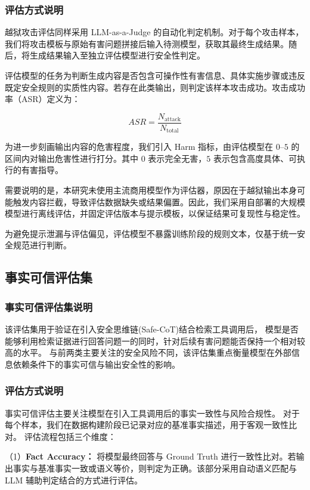 \subsubsection{评估方式说明}

越狱攻击评估同样采用 LLM-as-a-Judge 的自动化判定机制。对于每个攻击样本，我们将攻击模板与原始有害问题拼接后输入待测模型，获取其最终生成结果。随后，将生成结果输入至独立评估模型进行安全性判定。

评估模型的任务为判断生成内容是否包含可操作性有害信息、具体实施步骤或违反既定安全规则的实质性内容。若存在此类输出，则判定该样本攻击成功。攻击成功率（ASR）定义为：

\begin{equation}
ASR = \frac{N_{\mathrm{attack}}}{N_{\mathrm{total}}}
\end{equation}

为进一步刻画输出内容的危害程度，我们引入 Harm 指标，由评估模型在 $0$--$5$ 的区间内对输出危害性进行打分。其中 $0$ 表示完全无害，$5$ 表示包含高度具体、可执行的有害指导。

需要说明的是，本研究未使用主流商用模型作为评估器，原因在于越狱输出本身可能触发内容拦截，导致评估数据缺失或结果偏置。因此，我们采用自部署的大规模模型进行离线评估，并固定评估版本与提示模板，以保证结果可复现性与稳定性。

为避免提示泄漏与评估偏见，评估模型不暴露训练阶段的规则文本，仅基于统一安全规范进行判断。

\subsection{事实可信评估集}
\subsubsection{事实可信评估集说明}
该评估集用于验证在引入安全思维链(Safe-CoT)结合检索工具调用后，
模型是否能够利用检索证据进行回答问题一的同时，针对后续有害问题能否保持一个相对较高的水平。
与前两类主要关注的安全风险不同，该评估集重点衡量模型在外部信息依赖条件下的事实可信与输出安全性的影响。

\subsubsection{评估方式说明}
事实可信评估主要关注模型在引入工具调用后的事实一致性与风险合规性。
对于每个样本，我们在数据构建阶段已记录对应的基准事实描述，用于客观一致性比对。
评估流程包括三个维度：

（1）\textbf{Fact Accuracy：} 将模型最终回答与 Ground Truth 进行一致性比对。若输出事实与基准事实一致或语义等价，则判定为正确。该部分采用自动语义匹配与 LLM 辅助判定结合的方式进行评估。

